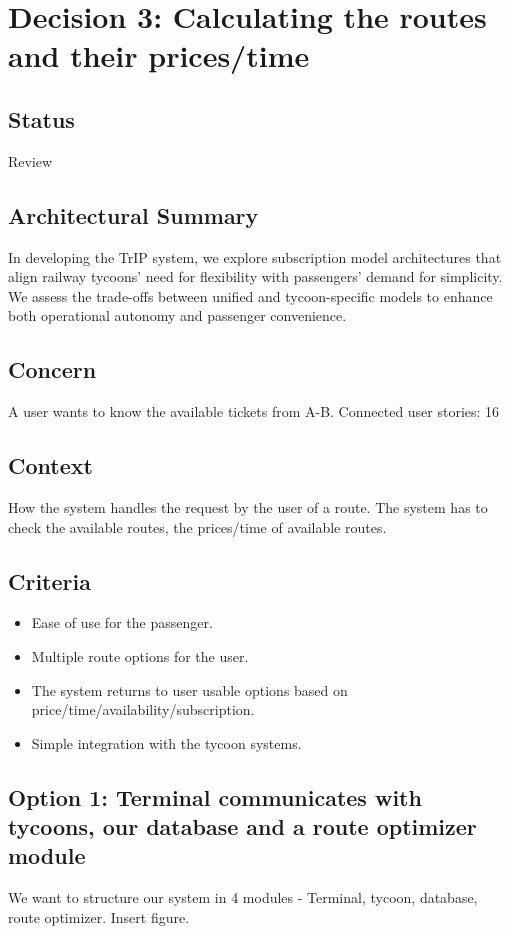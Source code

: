 \section*{Decision 3: Calculating the routes and their prices/time}

\subsection*{Status}
Review

\subsection*{Architectural Summary}
In developing the TrIP system, we explore subscription model architectures that align railway tycoons' need for flexibility with passengers' demand for simplicity. We assess the trade-offs between unified and tycoon-specific models to enhance both operational autonomy and passenger convenience.

\subsection*{Concern}
A user wants to know the available tickets from A-B. 
Connected user stories: 16

\subsection*{Context}
How the system handles the request by the user of a route. The system has to check the available routes, the prices/time of available routes.

\subsection*{Criteria}
\begin{itemize}
\item Ease of use for the passenger.
\item Multiple route options for the user.
\item The system returns to user usable options based on price/time/availability/subscription.
\item Simple integration with the tycoon systems.
\end{itemize}

\subsection*{Option 1: Terminal communicates with tycoons, our database and a route optimizer module}
We want to structure our system in 4 modules - Terminal, tycoon, database, route optimizer.
Insert figure.


